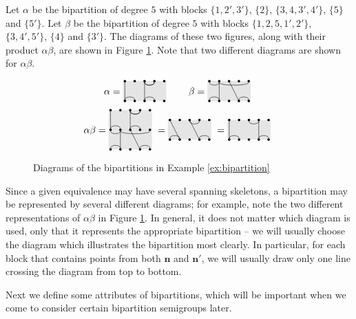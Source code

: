 \begin{example}
  \label{ex:bipartition}
  Let $\alpha$ be the bipartition of degree $5$ with blocks $\{1, 2', 3'\}$,
  $\{2\}$, $\{3, 4, 3', 4'\}$, $\{5\}$ and $\{5'\}$.  Let $\beta$ be the
  bipartition of degree $5$ with blocks $\{1, 2, 5, 1', 2'\}$, $\{3, 4', 5'\}$,
  $\{4\}$ and $\{3'\}$.  The diagrams of these two figures, along with their
  product $\alpha \beta$, are shown in Figure \ref{fig:bipartition-example}.
  Note that two different diagrams are shown for $\alpha \beta$.
  \begin{figure}[h]
    \centering
    $$\alpha = \bipartdiag{\tv11\bc12 \tc34 \tv33\tc34\bc34} \qquad
    \beta = \bipartdiag{\tc12\tc25\tv22\bc12 \tv34\bc45}$$
    $$\alpha \beta = \doublebipartdiag{\utv11\ubc12 \utc34 \utv33\utc34\ubc34
      \tc12\tc25\tv22\bc12 \tv34\bc45}
    = \bipartdiag{\tv12\bc12 \tc34\tv34\bc45}
    = \bipartdiag{\tv11\bc12 \tc34\tv44\bc45}$$
    \caption{Diagrams of the bipartitions in Example \ref{ex:bipartition}}
    \label{fig:bipartition-example}
  \end{figure}
\end{example}

Since a given equivalence may have several spanning skeletons, a bipartition may
be represented by several different diagrams; for example, note the two
different representations of $\alpha \beta$ in Figure
\ref{fig:bipartition-example}.  In general, it does not matter which diagram is
used, only that it represents the appropriate bipartition -- we will usually
choose the diagram which illustrates the bipartition most clearly.  In
particular, for each block that contains points from both $\mathbf{n}$ and
$\mathbf{n}'$, we will usually draw only one line crossing the diagram from top
to bottom.

Next we define some attributes of bipartitions, which will be important when we
come to consider certain bipartition semigroups later.

